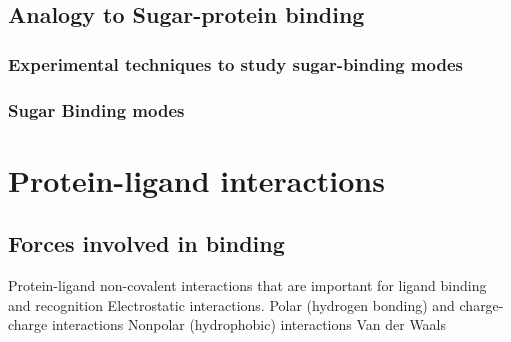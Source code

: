 \subsection{Analogy to Sugar-protein binding}
\subsubsection{Experimental techniques to study sugar-binding modes}
\subsubsection{Sugar Binding modes}

\section{Protein-ligand interactions}
\subsection{Forces involved in binding}
\begin{outline}
	\1 Protein-ligand non-covalent interactions that are important for ligand binding and recognition
		\2 Electrostatic interactions. Polar (hydrogen bonding) and charge-charge interactions
		\2 Nonpolar (hydrophobic) interactions
		  \3 Van der Waals
\end{outline}

